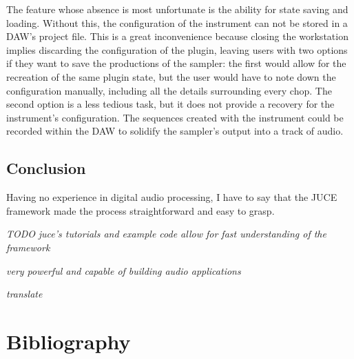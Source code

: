 \documentclass[12pt, a4paper, hidelinks]{article}
\begin{document}
	The feature whose absence is most unfortunate is the ability for state saving and loading. Without this, the configuration of the instrument can not be stored in a DAW's project file. This is a great inconvenience because closing the workstation implies discarding the configuration of the plugin, leaving users with two options if they want to save the productions of the sampler: the first would allow for the recreation of the same plugin state, but the user would have to note down the configuration manually, including all the details surrounding every chop. The second option is a less tedious task, but it does not provide a recovery for the instrument's configuration. The sequences created with the instrument could be recorded within the DAW to solidify the sampler's output into a track of audio.
	
	


	\newpage
	\subsection{Conclusion}
	Having no experience in digital audio processing, I have to say that the JUCE framework made the process straightforward and easy to grasp.

\textit{TODO}
\textit{	juce's tutorials and example code allow for fast understanding of the framework}

\textit{	very powerful and capable of building audio applications}

\textit{translate}
	
		
	\newpage
	\section{Bibliography}
	\printbibliography
	
\end{document}
